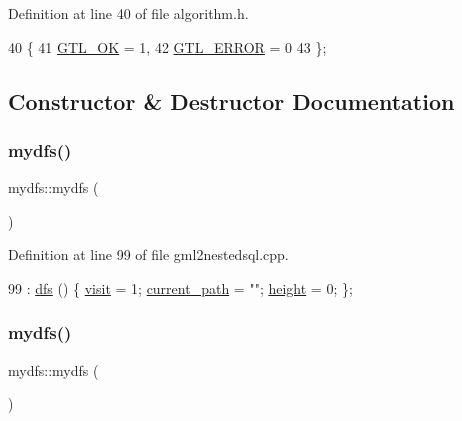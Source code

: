 Definition at line 40 of file algorithm.\+h.


\begin{DoxyCode}
40          \{
41     \mbox{\hyperlink{classalgorithm_af1a0078e153aa99c24f9bdf0d97f6710a5114c20e4a96a76b5de9f28bf15e282b}{GTL\_OK}} = 1,
42     \mbox{\hyperlink{classalgorithm_af1a0078e153aa99c24f9bdf0d97f6710a6fcf574690bbd6cf710837a169510dd7}{GTL\_ERROR}} = 0
43     \};
\end{DoxyCode}


\subsection{Constructor \& Destructor Documentation}
\mbox{\label{classmydfs_a7c6c14c2212762a9d01b4d4c1def822a}} 
\subsubsection{\texorpdfstring{mydfs()}{mydfs()}\hspace{0.1cm}{\footnotesize\ttfamily [1/2]}}
{\footnotesize\ttfamily mydfs\+::mydfs (\begin{DoxyParamCaption}{ }\end{DoxyParamCaption})\hspace{0.3cm}{\ttfamily [inline]}}



Definition at line 99 of file gml2nestedsql.\+cpp.


\begin{DoxyCode}
99 : \mbox{\hyperlink{classdfs_afe4e213d3f1f88a4ff57b2d72de232f4}{dfs}} () \{ \mbox{\hyperlink{classmydfs_a6d8114b5e013781c2aee9729bbec09d6}{visit}} = 1; \mbox{\hyperlink{classmydfs_a8b1c7457a3f24f71e12cfe8d8ee00d12}{current\_path}} = \textcolor{stringliteral}{""}; \mbox{\hyperlink{classmydfs_a4dfe98511fb86ff3cb365c20028cd1ae}{height}} = 0; \};
\end{DoxyCode}
\mbox{\label{classmydfs_a7c6c14c2212762a9d01b4d4c1def822a}} 
\subsubsection{\texorpdfstring{mydfs()}{mydfs()}\hspace{0.1cm}{\footnotesize\ttfamily [2/2]}}
{\footnotesize\ttfamily mydfs\+::mydfs (\begin{DoxyParamCaption}{ }\end{DoxyParamCaption})\hspace{0.3cm}{\ttfamily [inline]}}



